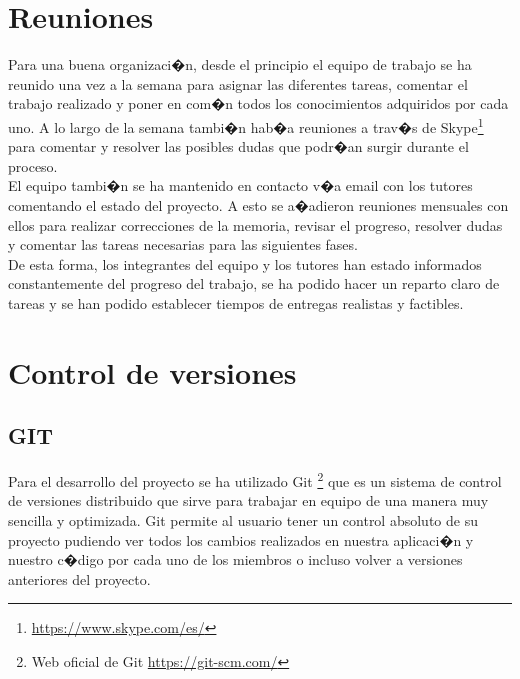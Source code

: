\section{Reuniones}
\label{cap4:sec:Reuniones}

Para una buena organizaci�n, desde el principio el equipo de trabajo se ha reunido una vez a la semana para asignar las diferentes tareas, comentar el trabajo realizado y poner en com�n todos los conocimientos adquiridos por cada uno. A lo largo de la semana tambi�n hab�a reuniones a trav�s de Skype\footnote {\url{https://www.skype.com/es/}} para comentar y resolver las posibles dudas que podr�an surgir durante el proceso. \\

El equipo tambi�n se ha mantenido en contacto v�a email con los tutores comentando el estado del proyecto. A esto se a�adieron reuniones mensuales con ellos para realizar correcciones de la memoria, revisar el progreso, resolver dudas y comentar las tareas necesarias para las siguientes fases.\\

De esta forma, los integrantes del equipo y los tutores han estado informados constantemente del progreso del trabajo, se ha podido hacer un reparto claro de tareas y se han podido establecer tiempos de entregas realistas y factibles.\\


\section{Control de versiones}
\label{cap4:sec:Control de versiones}
\subsection{GIT}

Para el desarrollo del proyecto se ha utilizado Git \footnote{Web oficial de Git \url{https://git-scm.com/}} que es un sistema de control de versiones distribuido que sirve para trabajar en equipo de una manera muy sencilla y optimizada. Git permite al usuario tener un control absoluto de su proyecto pudiendo ver todos los cambios realizados en nuestra aplicaci�n y nuestro c�digo por cada uno de los miembros o incluso volver a versiones anteriores del proyecto.

